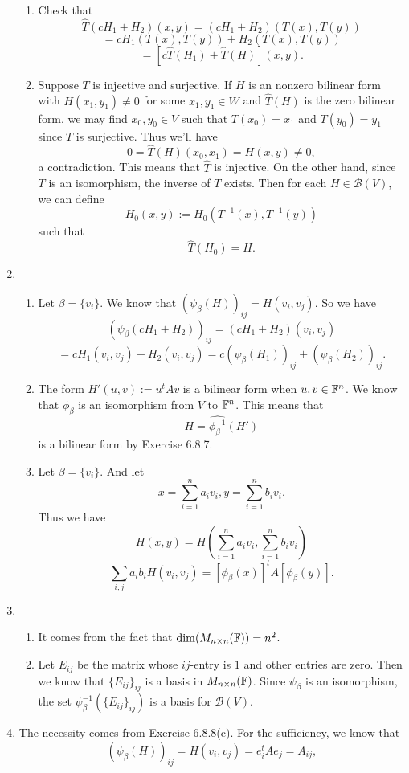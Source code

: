\begin{enumerate}
\begin{enumerate}
\item Check that 
\[\widehat{T}(cH_1+H_2)(x,y)=(cH_1+H_2)(T(x),T(y))\]
\[=cH_1(T(x),T(y))+H_2(T(x),T(y))\]
\[=[c\widehat{T}(H_1)+\widehat{T}(H)](x,y).\]
\item Suppose $T$ is injective and surjective. If $H$ is an nonzero bilinear form with $H(x_1,y_1)\neq 0$ for some $x_1,y_1\in W$ and $\widehat{T}(H)$ is the zero bilinear form, we may find $x_0,y_0\in V$ such that $T(x_0)=x_1$ and $T(y_0)=y_1$ since $T$ is surjective. Thus we'll have 
\[0=\widehat{T}(H)(x_0,x_1)=H(x,y)\neq 0,\]
a contradiction. This means that $\widehat{T}$ is injective. On the other hand, since $T$ is an isomorphism, the inverse of $T$ exists. Then for each $H\in \mathcal{B}(V)$, we can define 
\[H_0(x,y):=H_0(T^{-1}(x),T^{-1}(y))\]
such that 
\[\widehat{T}(H_0)=H.\]
\end{enumerate}
\item \begin{enumerate}
\item Let $\beta =\{v_i\}$. We know that $(\psi_{\beta}(H))_{ij}=H(v_i,v_j)$. So we have 
\[(\psi_{\beta}(cH_1+H_2))_{ij}=(cH_1+H_2)(v_i,v_j)\]
\[=cH_1(v_i,v_j)+H_2(v_i,v_j)=c(\psi_{\beta}(H_1))_{ij}+(\psi_{\beta}(H_2))_{ij}.\]
\item The form $H'(u,v):=u^tAv$ is a bilinear form when $u,v \in \mathbb{F}^n$. We know that $\phi_{\beta}$ is an isomorphism from $V$ to $\mathbb{F}^n$. This means that 
\[H=\widehat{\phi_{\beta}^{-1}}(H')\]
is a bilinear form by Exercise 6.8.7.
\item Let $\beta=\{v_i\}$. And let 
\[x=\sum_{i=1}^n{a_iv_i},y=\sum_{i=1}^n{b_iv_i}.\]
Thus we have 
\[H(x,y)=H(\sum_{i=1}^n{a_iv_i},\sum_{i=1}^n{b_iv_i})\]
\[\sum_{i,j}{a_ib_iH(v_i,v_j)}=[\phi_{\beta}(x)]^tA[\phi_{\beta}(y)].\]
\end{enumerate}
\item \begin{enumerate}
\item It comes from the fact that $\dim(M_{n\times n}(\mathbb{F}))=n^2$.
\item Let $E_{ij}$ be the matrix whose $ij$-entry is $1$ and other entries are zero. Then we know that $\{E_{ij}\}_{ij}$ is a basis in $M_{n\times n}(\mathbb{F})$. Since $\psi_{\beta}$ is an isomorphism, the set $\psi_{\beta}^{-1}(\{E_{ij}\}_{ij})$ is a basis for $\mathcal{B}(V)$.
\end{enumerate}
\item The necessity comes from Exercise 6.8.8(c). For the sufficiency, we know that 
\[(\psi_{\beta}(H))_{ij}=H(v_i,v_j)=e_i^tAe_j=A_{ij},\]

\end{enumerate}
